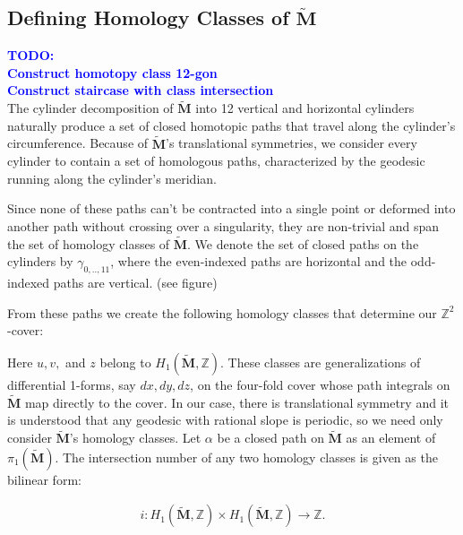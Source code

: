 \documentclass[]{article}
\newcommand{\compav}[1]{\textbf{\textcolor{blue}{#1}}}
\begin{document}
\newpage
\subsection{Defining Homology Classes of $\tilde{\mathbf{M}}$}
\compav{TODO:\\
Construct homotopy class 12-gon\\
Construct staircase with class intersection\\}
The cylinder decomposition of $\tilde{\mathbf{M}}$ into 12 vertical and horizontal cylinders naturally produce a set of closed homotopic paths that travel along the cylinder's circumference. Because of $\tilde{\mathbf{M}}$'s translational symmetries, we consider every cylinder to contain a set of homologous paths, characterized by the geodesic running along the cylinder's meridian. 

Since none of these paths can't be contracted into a single point or deformed into another path without crossing over a singularity, they are non-trivial and span the set of homology classes of $\tilde{\mathbf{M}}$. We denote the set of closed paths on the cylinders by $\gamma_{0,..,11}$, where the even-indexed paths are horizontal and the odd-indexed paths are vertical. (see figure)

From these paths we create the following homology classes that determine our $\mathbb{Z}^2$-cover:



Here $u,v,$ and $z$ belong to $H_1(\tilde{\mathbf{M}},\mathbb Z)$. These classes are generalizations of differential 1-forms, say $dx,dy,dz$, on the four-fold cover whose path integrals on $\tilde{\mathbf{M}}$ map directly to the cover.  In our case, there is translational symmetry and it is understood that any geodesic with rational slope is periodic, so we need only consider $\tilde{\mathbf{M}}$'s homology classes. Let $\alpha$ be a closed path on $\tilde{\mathbf{M}}$ as an element of $\pi_1(\tilde{\mathbf{M}})$. The intersection number of any two homology classes is given as the bilinear form:

\begin{align}
i:H_1(\tilde{\mathbf{M}},\mathbb Z)\times H_1(\tilde{\mathbf{M}},\mathbb Z)\rightarrow \mathbb Z.
\end{align}
\end{document}
